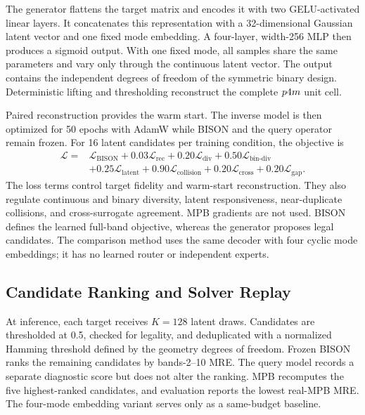 The generator flattens the target matrix and encodes it with two
GELU-activated linear layers. It concatenates this representation with a
32-dimensional Gaussian latent vector and one fixed mode embedding. A
four-layer, width-256 MLP then produces a sigmoid output. With one fixed mode,
all samples share the same parameters and vary only through the continuous
latent vector. The output contains the independent degrees of freedom of the
symmetric binary design. Deterministic lifting and thresholding reconstruct
the complete \(p4m\) unit cell.

Paired reconstruction provides the warm start. The inverse model is then
optimized for 50 epochs with AdamW while BISON and the query operator remain
frozen. For 16 latent candidates per training condition, the objective is
\begin{equation}
\begin{split}
  \mathcal{L}={}&\mathcal{L}_{\mathrm{BISON}}
  +0.03\mathcal{L}_{\mathrm{rec}}
  +0.20\mathcal{L}_{\mathrm{div}}
  +0.50\mathcal{L}_{\mathrm{bin\text{-}div}}\\
  &+0.25\mathcal{L}_{\mathrm{latent}}
  +0.90\mathcal{L}_{\mathrm{collision}}
  +0.20\mathcal{L}_{\mathrm{cross}}
  +0.20\mathcal{L}_{\mathrm{gap}}.
  \label{eq:inverse-objective}
\end{split}
\end{equation}
The loss terms control target fidelity and warm-start reconstruction. They also
regulate continuous and binary diversity, latent responsiveness, near-duplicate
collisions, and cross-surrogate agreement. MPB gradients are not used. BISON defines the
learned full-band objective, whereas the generator proposes legal candidates.
The comparison method uses the same decoder with four cyclic mode embeddings;
it has no learned router or independent experts.

\subsection{Candidate Ranking and Solver Replay}

At inference, each target receives \(K=128\) latent draws. Candidates are
thresholded at 0.5, checked for legality, and deduplicated with a normalized
Hamming threshold defined by the geometry degrees of freedom. Frozen BISON
ranks the remaining candidates by bands-2--10 MRE. The query model records a
separate diagnostic score but does not alter the ranking. MPB recomputes the
five highest-ranked candidates, and evaluation reports the lowest real-MPB
MRE. The four-mode embedding variant serves only as a same-budget baseline.
